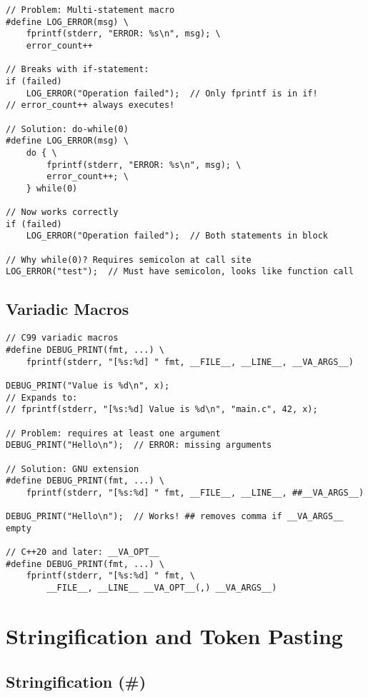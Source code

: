 \begin{lstlisting}
// Problem: Multi-statement macro
#define LOG_ERROR(msg) \
    fprintf(stderr, "ERROR: %s\n", msg); \
    error_count++

// Breaks with if-statement:
if (failed)
    LOG_ERROR("Operation failed");  // Only fprintf is in if!
// error_count++ always executes!

// Solution: do-while(0)
#define LOG_ERROR(msg) \
    do { \
        fprintf(stderr, "ERROR: %s\n", msg); \
        error_count++; \
    } while(0)

// Now works correctly
if (failed)
    LOG_ERROR("Operation failed");  // Both statements in block

// Why while(0)? Requires semicolon at call site
LOG_ERROR("test");  // Must have semicolon, looks like function call
\end{lstlisting}

\subsection{Variadic Macros}

\begin{lstlisting}
// C99 variadic macros
#define DEBUG_PRINT(fmt, ...) \
    fprintf(stderr, "[%s:%d] " fmt, __FILE__, __LINE__, __VA_ARGS__)

DEBUG_PRINT("Value is %d\n", x);
// Expands to:
// fprintf(stderr, "[%s:%d] Value is %d\n", "main.c", 42, x);

// Problem: requires at least one argument
DEBUG_PRINT("Hello\n");  // ERROR: missing arguments

// Solution: GNU extension
#define DEBUG_PRINT(fmt, ...) \
    fprintf(stderr, "[%s:%d] " fmt, __FILE__, __LINE__, ##__VA_ARGS__)

DEBUG_PRINT("Hello\n");  // Works! ## removes comma if __VA_ARGS__ empty

// C++20 and later: __VA_OPT__
#define DEBUG_PRINT(fmt, ...) \
    fprintf(stderr, "[%s:%d] " fmt, \
        __FILE__, __LINE__ __VA_OPT__(,) __VA_ARGS__)
\end{lstlisting}

\section{Stringification and Token Pasting}

\subsection{Stringification (\#)}

